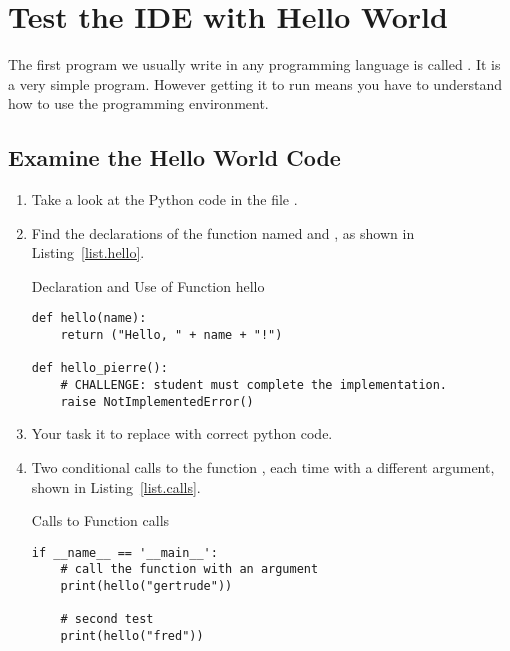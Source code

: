 \section{Test the IDE with Hello World}
\label{sec.hello.world}

The first program we usually write in any programming language is
called .  It is a very simple program.  However
getting it to run means you have to understand how to use the
programming environment.

\subsection{Examine the Hello World Code}
\label{sec.examine.the.code}
\begin{enumerate}
\item Take a look at the Python code in the file . 

\item Find the declarations of the function named  and
 , as shown in Listing~\ref{list.hello}.

\begin{listing}{Declaration and Use of Function }{hello}
\begin{minipage}[c]{0.95\textwidth}\begin{lstlisting}
def hello(name):
    return ("Hello, " + name + "!")

def hello_pierre():
    # CHALLENGE: student must complete the implementation.
    raise NotImplementedError()
\end{lstlisting}\end{minipage}\end{listing}

\item Your task it to replace  with correct python code.

\item Two conditional calls to the function , each time
  with a different argument, shown in Listing~\ref{list.calls}.


\begin{listing}{Calls to Function }{calls}
\begin{minipage}[c]{0.95\textwidth}\begin{lstlisting}
if __name__ == '__main__':
    # call the function with an argument
    print(hello("gertrude"))
    
    # second test
    print(hello("fred"))


\end{lstlisting}
\end{minipage}
\end{listing}
\end{enumerate}

